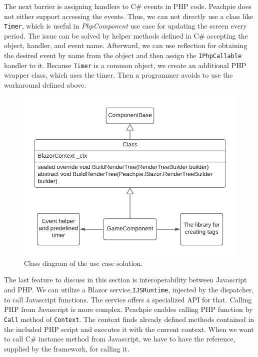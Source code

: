 \par
The next barrier is assigning handlers to C\# events in PHP code.
Peachpie does not either support accessing the events.
Thus, we can not directly use a class like \texttt{Timer}, which is useful in \textit{PhpComponent} use case for updating the screen every period.
The issue can be solved by helper methods defined in C\# accepting the object, handler, and event name.
Afterward, we can use reflection for obtaining the desired event by name from the object and then assign the \texttt{IPhpCallable} handler to it.
Because \texttt{Timer} is a common object, we create an additional PHP wrapper class, which uses the timer.
Then a programmer avoids to use the workaround defined above.
\par
\begin{figure}\centering
\includegraphics[scale=0.8]{./img/PhpComponentSolution}
\caption{Class diagram of the use case solution.}
\label{img17:solution}
\end{figure}
\par
The last feature to discuss in this section is interoperability between Javascript and PHP.
We can utilize a Blazor service,\texttt{IJSRuntime}, injected by the dispatcher, to call Javascript functions.
The service offers a specialized API for that.
Calling PHP from Javascript is more complex.
Peachpie enables calling PHP function by \texttt{Call} method of \texttt{Context}. 
The context finds already defined methods contained in the included PHP script and executes it with the current context.
When we want to call C\# instance method from Javascript, we have to have the reference, supplied by the framework, for calling it.
